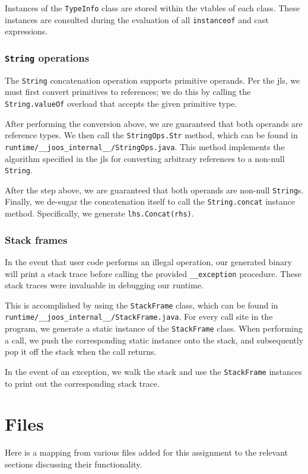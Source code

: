 \documentclass[12pt, titlepage]{article}
\newcommand{\z}[1]{\texttt{#1}}
\begin{document}
Instances of the \z{TypeInfo} class are stored within the vtables of each
class. These instances are consulted during the evaluation of all
\z{instanceof} and cast expressions.

\subsubsection{\z{String} operations}\label{subsubsec:strops}
The \z{String} concatenation operation supports primitive operands. Per the
\ac{jls}, we must first convert primitives to references; we do this by calling
the \z{String.valueOf} overload that accepts the given primitive type.

After performing the conversion above, we are guaranteed that both operands are
reference types. We then call the \z{StringOps.Str} method, which can be found
in \\\z{runtime/\_\_joos\_internal\_\_/StringOps.java}. This method implements
the algorithm specified in the \ac{jls} for converting arbitrary references to
a non-null \z{String}.

After the step above, we are guaranteed that both operands are non-null
\z{String}s. Finally, we de-sugar the concatenation itself to call the
\z{String.concat} instance method. Specifically, we generate
\z{lhs.Concat(rhs)}.

\subsubsection{Stack frames}\label{subsubsec:stacks}
In the event that user code performs an illegal operation, our generated binary
will print a stack trace before calling the provided \z{\_\_exception}
procedure. These stack traces were invaluable in debugging our runtime.

This is accomplished by using the \z{StackFrame} class, which can be found in
\\\z{runtime/\_\_joos\_internal\_\_/StackFrame.java}. For every call site in
the program, we generate a static instance of the \z{StackFrame} class. When
performing a call, we push the corresponding static instance onto the stack,
and subsequently pop it off the stack when the call returns.

In the event of an exception, we walk the stack and use the \z{StackFrame}
instances to print out the corresponding stack trace.

\section{Files}
Here is a mapping from various files added for this assignment to the relevant
sections discussing their functionality.
\end{document}
